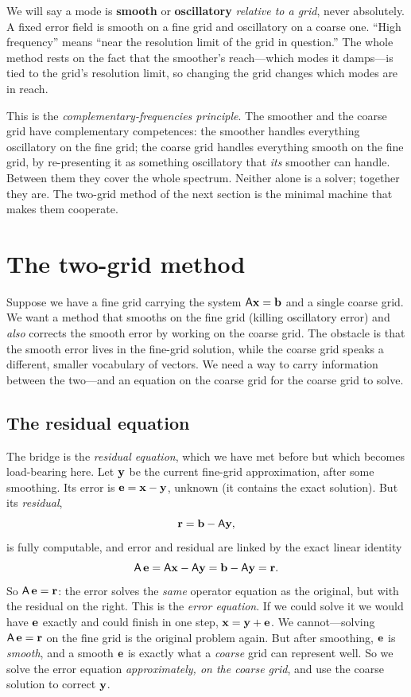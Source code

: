 \begin{notationbox}
We will say a mode is \textbf{smooth} or \textbf{oscillatory} \emph{relative to a
grid}, never absolutely. A fixed error field is smooth on a fine grid and oscillatory
on a coarse one. ``High frequency'' means ``near the resolution limit of the grid in
question.'' The whole method rests on the fact that the smoother's reach---which modes
it damps---is tied to the grid's resolution limit, so changing the grid changes which
modes are in reach.
\end{notationbox}

This is the \emph{complementary-frequencies principle}. The smoother and the coarse
grid have complementary competences: the smoother handles everything oscillatory on the
fine grid; the coarse grid handles everything smooth on the fine grid, by re-presenting
it as something oscillatory that \emph{its} smoother can handle. Between them they cover
the whole spectrum. Neither alone is a solver; together they are. The two-grid method
of the next section is the minimal machine that makes them cooperate.

\section{The two-grid method}
\label{sec:twogrid}

Suppose we have a fine grid carrying the system $\mathsf{A}\mathbf{x}=\mathbf{b}$ and a single coarse
grid. We want a method that smooths on the fine grid (killing oscillatory error) and
\emph{also} corrects the smooth error by working on the coarse grid. The obstacle is
that the smooth error lives in the fine-grid solution, while the coarse grid speaks a
different, smaller vocabulary of vectors. We need a way to carry information between the
two---and an equation on the coarse grid for the coarse grid to solve.

\subsection{The residual equation}

The bridge is the \emph{residual equation}, which we have met before but which becomes
load-bearing here. Let $\mathbf{y}$ be the current fine-grid approximation, after some
smoothing. Its error is $\mathbf{e} = \mathbf{x} - \mathbf{y}$, unknown (it contains the exact solution). But
its \emph{residual},
\[
  \mathbf{r} = \mathbf{b} - \mathsf{A}\mathbf{y},
\]
is fully computable, and error and residual are linked by the exact linear identity
\[
  \mathsf{A}\,\mathbf{e} = \mathsf{A}\mathbf{x} - \mathsf{A}\mathbf{y} = \mathbf{b} - \mathsf{A}\mathbf{y} = \mathbf{r}.
\]
So $\mathsf{A}\,\mathbf{e} = \mathbf{r}$: the error solves the \emph{same} operator equation as the
original, but with the residual on the right. This is the \emph{error equation}. If we
could solve it we would have $\mathbf{e}$ exactly and could finish in one step, $\mathbf{x} = \mathbf{y} +
\mathbf{e}$. We cannot---solving $\mathsf{A}\,\mathbf{e}=\mathbf{r}$ on the fine grid is the original problem
again. But after smoothing, $\mathbf{e}$ is \emph{smooth}, and a smooth $\mathbf{e}$ is exactly what a
\emph{coarse} grid can represent well. So we solve the error equation
\emph{approximately, on the coarse grid}, and use the coarse solution to correct $\mathbf{y}$.

